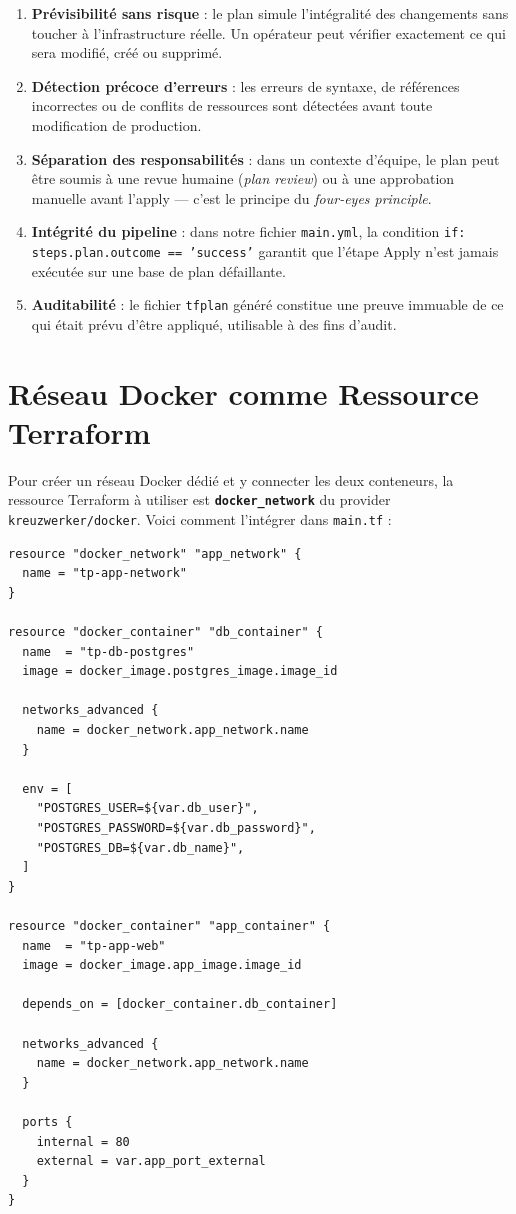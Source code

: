 \documentclass[12pt,a4paper]{report}
\begin{document}
\begin{enumerate}
  \item \textbf{Prévisibilité sans risque} : le plan simule l'intégralité des changements
        sans toucher à l'infrastructure réelle. Un opérateur peut vérifier exactement
        ce qui sera modifié, créé ou supprimé.

  \item \textbf{Détection précoce d'erreurs} : les erreurs de syntaxe, de références
        incorrectes ou de conflits de ressources sont détectées avant toute modification
        de production.

  \item \textbf{Séparation des responsabilités} : dans un contexte d'équipe, le plan
        peut être soumis à une revue humaine (\textit{plan review}) ou à une approbation
        manuelle avant l'apply --- c'est le principe du \textit{four-eyes principle}.

  \item \textbf{Intégrité du pipeline} : dans notre fichier \texttt{main.yml}, la condition
        \texttt{if: steps.plan.outcome == 'success'} garantit que l'étape Apply
        n'est jamais exécutée sur une base de plan défaillante.

  \item \textbf{Auditabilité} : le fichier \texttt{tfplan} généré constitue une preuve
        immuable de ce qui était prévu d'être appliqué, utilisable à des fins d'audit.
\end{enumerate}

\section{Réseau Docker comme Ressource Terraform}

Pour créer un réseau Docker dédié et y connecter les deux conteneurs, la ressource
Terraform à utiliser est \textbf{\texttt{docker\_network}} du provider
\texttt{kreuzwerker/docker}. Voici comment l'intégrer dans \texttt{main.tf} :

\begin{lstlisting}[style=terraform, caption={Ajout d'un réseau Docker partagé}]
resource "docker_network" "app_network" {
  name = "tp-app-network"
}

resource "docker_container" "db_container" {
  name  = "tp-db-postgres"
  image = docker_image.postgres_image.image_id

  networks_advanced {
    name = docker_network.app_network.name
  }

  env = [
    "POSTGRES_USER=${var.db_user}",
    "POSTGRES_PASSWORD=${var.db_password}",
    "POSTGRES_DB=${var.db_name}",
  ]
}

resource "docker_container" "app_container" {
  name  = "tp-app-web"
  image = docker_image.app_image.image_id

  depends_on = [docker_container.db_container]

  networks_advanced {
    name = docker_network.app_network.name
  }

  ports {
    internal = 80
    external = var.app_port_external
  }
}
\end{lstlisting}
\end{document}
